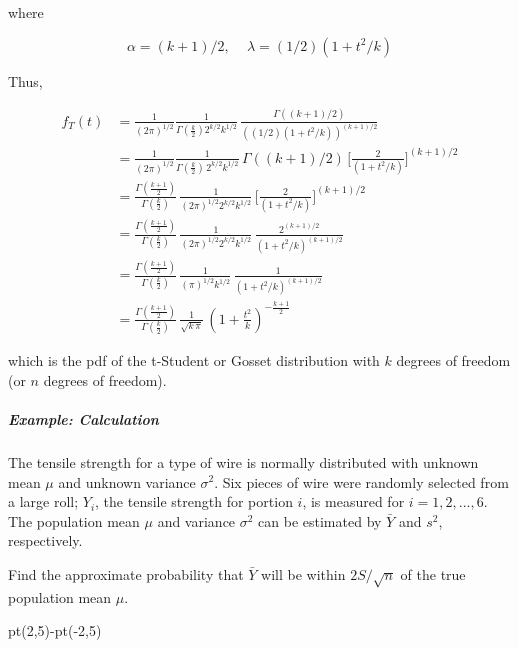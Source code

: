 \documentclass[
  letterpaper,
  DIV=11,
  numbers=noendperiod]{scrreprt}
\let\oldsubparagraph\subparagraph
\renewcommand{\subparagraph}[1]{\oldsubparagraph{#1}\mbox{}}
\newenvironment{Shaded}{\begin{snugshade}}{\end{snugshade}}
\newcommand{\DecValTok}[1]{\textcolor[rgb]{0.68,0.00,0.00}{#1}}
\newcommand{\FunctionTok}[1]{\textcolor[rgb]{0.28,0.35,0.67}{#1}}
\newcommand{\NormalTok}[1]{\textcolor[rgb]{0.00,0.23,0.31}{#1}}
\newcommand{\SpecialCharTok}[1]{\textcolor[rgb]{0.37,0.37,0.37}{#1}}
\theoremstyle{plain}
\theoremstyle{remark}
\begin{document}
where

\[
   \alpha=(k+1)/2,\,\quad \lambda=(1/2)(1+t^2/k)
\]

Thus,

\[
   \begin{aligned}
   f_T(t)&= \frac{1}{(2\pi)^{1/2}}\frac{1}{\Gamma\left(\frac{k}{2}\right)2^{k/2}k^{1/2}}\,
   \frac{\Gamma\left((k+1)/2\right)}{\left((1/2)(1+t^2/k)\right)^{(k+1)/2}}\\[2ex]
   &=\frac{1}{(2\pi)^{1/2}}\frac{1}{\Gamma\left(\frac{k}{2}\right)\,2^{k/2}k^{1/2}}\,\Gamma\left((k+1)/2\right)\,
   \Big[\frac{2}{(1+t^2/k)}\Big]^{(k+1)/2}\\[2ex]
   &= \frac{\Gamma\left(\frac{k+1}{2}\right)}{\Gamma\left(\frac{k}{2}\right)}\,
   \frac{1}{(2\pi)^{1/2}2^{k/2}k^{1/2}}\,
   \Big[\frac{2}{(1+t^2/k)}\Big]^{(k+1)/2}\\[2ex]
   &=\frac{\Gamma\left(\frac{k+1}{2}\right)}{\Gamma\left(\frac{k}{2}\right)}\,
   \frac{1}{(2\pi)^{1/2}2^{k/2}k^{1/2}}\,
   \frac{2^{(k+1)/2}}{(1+t^2/k)^{(k+1)/2}}\\[2ex]
   &= \frac{\Gamma\left(\frac{k+1}{2}\right)}{\Gamma\left(\frac{k}{2}\right)}\,
   \frac{1}{(\pi)^{1/2}k^{1/2}}\,
   \frac{1}{(1+t^2/k)^{(k+1)/2}}\\[2ex]
   &=\frac{\Gamma(\frac{k+1}{2})}{\Gamma(\frac{k}{2})}\,
   \frac{1}{\sqrt{k\,\pi}}\,
   \left(1+\frac{t^2}{k}\right)^{-\frac{k+1}{2}}
   \end{aligned}
\]

which is the pdf of the t-Student or Gosset distribution with \(k\)
degrees of freedom (or \(n\) degrees of freedom).

\hypertarget{example-calculation-2}{%
\subparagraph{Example: Calculation}\label{example-calculation-2}}

The tensile strength for a type of wire is normally distributed with
unknown mean \(\mu\) and unknown variance \(\sigma^2\). Six pieces of
wire were randomly selected from a large roll; \(Y_i\), the tensile
strength for portion \(i\), is measured for \(i = 1, 2, . . . , 6\). The
population mean \(\mu\) and variance \(\sigma^2\) can be estimated by
\(\bar{Y}\) and \(s^2\), respectively.

Find the approximate probability that \(\bar{Y}\) will be within
\(2S/\sqrt{n}\) of the true population mean \(\mu\).

\begin{Shaded}
\begin{Highlighting}[]
\FunctionTok{pt}\NormalTok{(}\DecValTok{2}\NormalTok{,}\DecValTok{5}\NormalTok{)}\SpecialCharTok{{-}}\FunctionTok{pt}\NormalTok{(}\SpecialCharTok{{-}}\DecValTok{2}\NormalTok{,}\DecValTok{5}\NormalTok{)}
\end{Highlighting}
\end{Shaded}
\end{document}
